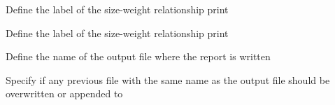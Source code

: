  {Define the label of the size-weight relationship print}

 {Define the label of the size-weight relationship print}

 {Define the name of the output file where the report is written}

 {Specify if any previous file with the same name as the output file should be overwritten or appended to}
